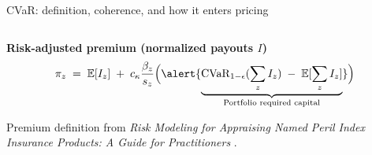 \documentclass{beamer}
\begin{document}
\begin{frame}{CVaR: definition, coherence, and how it enters pricing}
\begin{minipage}[t][0.3\textheight][t]{\textwidth}
\begin{columns}[T,totalwidth=\textwidth]
    \end{columns}
    \end{minipage}
    
    \begin{minipage}[t][0.70\textheight][t]{\textwidth}
    \textbf{Risk-adjusted premium (normalized payouts \(I\))}
    \[
    \pi_z \;=\; \mathbb{E}[I_z] \;+\; c_\kappa \frac{\beta_z}{s_z}\Big( \alert{\underbrace{\mathrm{CVaR}_{1-\epsilon}(\sum_z I_z)\;-\;\mathbb{E}[\sum_z I_z]}_{\text{Portfolio required capital}}}\Big)
    \]
    
    
    {\scriptsize Premium definition from \textit{Risk Modeling for Appraising Named Peril Index Insurance Products: A Guide for Practitioners} \cite{mapfumo2017risk}.}
    \end{minipage}
    
    \end{frame}
\end{document}
